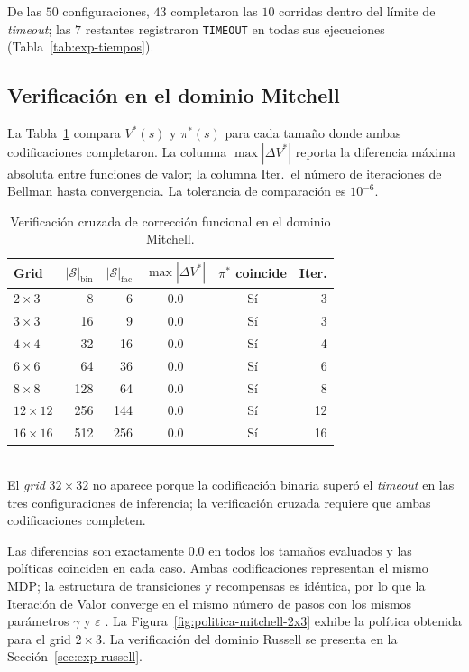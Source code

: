 De las $50$ configuraciones, $43$ completaron las $10$ corridas dentro del límite de \textit{timeout}; las $7$ restantes registraron \texttt{TIMEOUT} en todas sus ejecuciones (Tabla~\ref{tab:exp-tiempos}).

\subsection{Verificación en el dominio Mitchell}
\label{sec:exp-rq1-mitchell}

La Tabla~\ref{tab:exp-correccion} compara $V^*(s)$ y $\pi^*(s)$ para cada
tamaño donde ambas codificaciones completaron. La columna $\max|\Delta V^*|$
reporta la diferencia máxima absoluta entre funciones de valor; la columna
Iter.\ el número de iteraciones de Bellman hasta convergencia. La tolerancia
de comparación es $10^{-6}$.

\begin{table}[H]
    \centering
    \caption{Verificación cruzada de corrección funcional en el dominio Mitchell.}
    \label{tab:exp-correccion}
    \small
    \begin{tabular}{l r r c c r}
        \toprule
        \textbf{Grid} & $|\mathcal{S}|_{\text{bin}}$ & $|\mathcal{S}|_{\text{fac}}$ & $\max|\Delta V^*|$ & \textbf{$\pi^*$ coincide} & \textbf{Iter.} \\
        \midrule
        $2 \times 3$   &    8 &    6 & 0.0 & Sí & 3  \\
        $3 \times 3$   &   16 &    9 & 0.0 & Sí & 3  \\
        $4 \times 4$   &   32 &   16 & 0.0 & Sí & 4  \\
        $6 \times 6$   &   64 &   36 & 0.0 & Sí & 6  \\
        $8 \times 8$   &  128 &   64 & 0.0 & Sí & 8  \\
        $12 \times 12$ &  256 &  144 & 0.0 & Sí & 12 \\
        $16 \times 16$ &  512 &  256 & 0.0 & Sí & 16 \\
        \bottomrule
    \end{tabular}
    \smallskip\\
    \footnotesize{El \textit{grid} $32 \times 32$ no aparece porque la codificación binaria superó el \textit{timeout} en las tres configuraciones de inferencia; la verificación cruzada requiere que ambas codificaciones completen.}
\end{table}

Las diferencias son exactamente $0.0$ en todos los tamaños evaluados y las
políticas coinciden en cada caso. Ambas codificaciones representan el mismo
MDP; la estructura de transiciones y recompensas es idéntica, por lo que la
Iteración de Valor converge en el mismo número de pasos con los mismos
parámetros $\gamma$ y $\varepsilon$ \cite{puterman2014markov}.
La Figura~\ref{fig:politica-mitchell-2x3} exhibe la política obtenida para el
grid $2\times3$. La verificación del dominio Russell se presenta en la
Sección~\ref{sec:exp-russell}.


